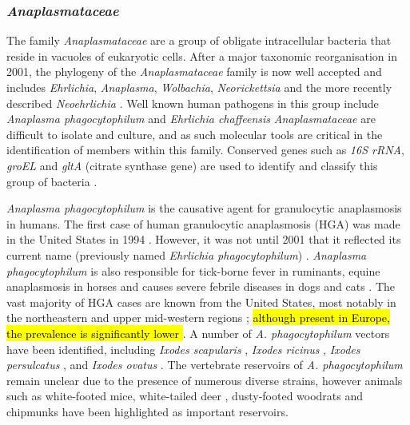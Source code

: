 \documentclass[a4paper, nobind]{templates/ociamthesis}
\begin{document}
\hypertarget{anaplasmataceae}{%
\subsubsection{\texorpdfstring{\emph{Anaplasmataceae}}{Anaplasmataceae}}\label{anaplasmataceae}}

The family \emph{Anaplasmataceae} are a group of obligate intracellular bacteria that reside in vacuoles of eukaryotic cells.
After a major taxonomic reorganisation in 2001, the phylogeny of the \emph{Anaplasmataceae} family is now well accepted and includes \emph{Ehrlichia}, \emph{Anaplasma}, \emph{Wolbachia}, \emph{Neorickettsia} and the more recently described \emph{Neoehrlichia} \autocite{rarGeneticDiversityAnaplasma2021}.
Well known human pathogens in this group include \emph{Anaplasma phagocytophilum} and \emph{Ehrlichia chaffeensis}
\emph{Anaplasmataceae} are difficult to isolate and culture, and as such molecular tools are critical in the identification of members within this family.
Conserved genes such as \emph{16S rRNA}, \emph{groEL} and \emph{gltA} (citrate synthase gene) are used to identify and classify this group of bacteria \autocite{kawaharaUltrastructurePhylogeneticAnalysis2004}.

\emph{Anaplasma phagocytophilum} is the causative agent for granulocytic anaplasmosis in humans. The first case of human granulocytic anaplasmosis (HGA) was made in the United States in 1994 \autocite{chenIdentificationGranulocytotropicEhrlichia1994}.
However, it was not until 2001 that it reflected its current name (previously named \emph{Ehrlichia phagocytophilum}) \autocite{dumlerReorganizationGeneraFamilies2001}.
\emph{Anaplasma phagocytophilum} is also responsible for tick-borne fever in ruminants, equine anaplasmosis in horses and causes severe febrile diseases in dogs and cats \autocite{rarAnaplasmaEhrlichiaCandidatus2011}.
The vast majority of HGA cases are known from the United States, most notably in the northeastern and upper mid-western regions \autocite{mmwrFinal2009Reports2010}; \hl{although present in Europe, the prevalence is significantly lower \autocite{bakkenHumanGranulocyticAnaplasmosis2015}}.
A number of \emph{A. phagocytophilum} vectors have been identified, including \emph{Ixodes scapularis} \autocite{telfordPerpetuationAgentHuman1996,hodzicAcquisitionTransmissionAgent1998}, \emph{Ixodes ricinus} \autocite{lizPCRDetectionGranulocytic2000}, \emph{Ixodes persulcatus} \autocite{eremeevaPrevalenceBacterialAgents2006}, and \emph{Ixodes ovatus} \autocite{ohashiAnaplasmaPhagocytophilumInfected2005}.
The vertebrate reservoirs of \emph{A. phagocytophilum} remain unclear due to the presence of numerous diverse strains, however animals such as white-footed mice, white-tailed deer \autocite{telfordPerpetuationAgentHuman1996,ravynIsolationEtiologicAgent2001}, dusty-footed woodrats \autocite{nicholsonDuskyFootedWoodRats1999} and chipmunks \autocite{foleyDistinctEcologicallyRelevant2009} have been highlighted as important reservoirs.
\end{document}
